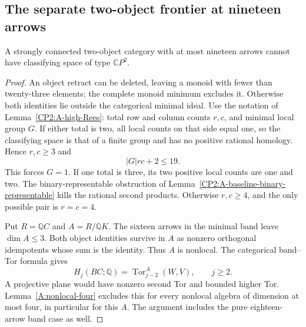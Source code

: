 \subsection{The separate two-object frontier at nineteen arrows}

\begin{proposition}
\label{CP2:A-strong-two-nineteen}
A strongly connected two-object category with at most nineteen
arrows cannot have classifying space of type $\mathbb CP^2$.
\end{proposition}
\begin{proof}
An object retract can be deleted, leaving a monoid with fewer than
twenty-three elements; the complete monoid minimum excludes it.
Otherwise both identities lie outside the categorical minimal ideal.
Use the notation of Lemma~\ref{CP2:A-high-Rees}: total row and column
counts $r,c$, and minimal local group $G$.  If either total is two,
all local counts on that side equal one, so the classifying space
is that of a finite group and has no positive rational homology.
Hence $r,c\ge3$ and
\[
 |G|rc+2\le19.
\]
This forces $G=1$.  If one total is three, its two positive local
counts are one and two.  The binary-representable obstruction of
Lemma~\ref{CP2:A-baseline-binary-representable} kills the rational
second products.  Otherwise $r,c\ge4$, and the only possible pair
is $r=c=4$.

Put $R=\mathbb QC$ and $A=R/\mathbb QK$.  The sixteen arrows in the
minimal band leave $\dim A\le3$.  Both object identities survive in
$A$ as nonzero orthogonal idempotents whose sum is the identity.
Thus $A$ is nonlocal.  The categorical band--Tor formula gives
\[
 H_j(BC;\mathbb Q)=\operatorname{Tor}_{j-2}^{A}(W,V),\qquad j\ge2.
\]
A projective plane would have nonzero second Tor and bounded higher
Tor.  Lemma~\ref{A:nonlocal-four} excludes this for every nonlocal
algebra of dimension at most four, in particular for this $A$.
The argument includes the pure eighteen-arrow band case as well.
\end{proof}

